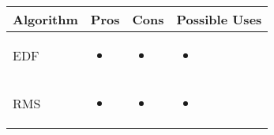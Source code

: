 \documentclass[./report.tex]{subfiles}
\begin{document}
\begin{tabular}{|m{8em}|m{12em}|m{12em}|m{12em}|} 
	\hline 
	\textbf{Algorithm} & \textbf{Pros} & \textbf{Cons} & \textbf{Possible Uses} \\ 
	\hline
	EDF 
	&  
	\begin{itemize}[leftmargin=*]
		\item 
	\end{itemize}
	&  
	\begin{itemize}[leftmargin=*]
		\item 
	\end{itemize}
	& 
	\begin{itemize}[leftmargin=*]
		\item 
	\end{itemize}
	\\
	\hline
	RMS 
	& 
	\begin{itemize}[leftmargin=*]
		\item 
	\end{itemize} 
	&  
	\begin{itemize}[leftmargin=*]
		\item 
	\end{itemize}
	& 
	\begin{itemize}[leftmargin=*]
		\item 
	\end{itemize}
	\\
	\hline
\end{tabular}
\end{document}
